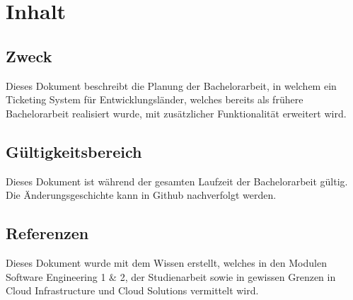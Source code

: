 \newpage
\section{Inhalt}
\subsection{Zweck}
Dieses Dokument beschreibt die Planung der Bachelorarbeit, in welchem ein Ticketing System für Entwicklungsländer, welches bereits als frühere Bachelorarbeit realisiert wurde, mit zusätzlicher Funktionalität erweitert wird.

\subsection{Gültigkeitsbereich}
Dieses Dokument ist während der gesamten Laufzeit der Bachelorarbeit gültig. Die Änderungsgeschichte kann in Github nachverfolgt werden.

\subsection{Referenzen}
Dieses Dokument wurde mit dem Wissen erstellt, welches in den Modulen Software Engineering 1 \& 2, der Studienarbeit sowie in gewissen Grenzen in Cloud Infrastructure und Cloud Solutions vermittelt wird.


\newpage
